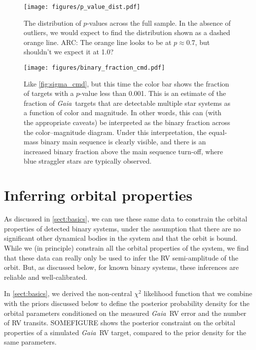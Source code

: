 \documentclass[modern, letterpaper]{aastex631}
\newcommand{\project}[1]{\textsl{#1}}
\newcommand{\Gaia}{\project{Gaia}}
\begin{document}
\begin{figure}
	\begin{centering}
		\texttt{[image: figures/p\_value\_dist.pdf]}
		\caption{The distribution of $p$-values across the full sample. In the absence of outliers, we would expect to find the distribution shown as a dashed orange line. ARC: The orange line looks to be at $p \approx$0.7, but shouldn't we expect it at 1.0?}
		\label{fig:p_value_dist}
	\end{centering}
\end{figure}

\begin{figure}
	\begin{centering}
		\texttt{[image: figures/binary\_fraction\_cmd.pdf]}
		\caption{Like \autoref{fig:sigma_cmd}, but this time the color bar shows the fraction of targets with a $p$-value less than 0.001. This is an estimate of the fraction of \Gaia\ targets that are detectable multiple star systems as a function of color and magnitude. In other words, this can (with the appropriate caveats) be interpreted as the binary fraction across the color--magnitude diagram. Under this interpretation, the equal-mass binary main sequence is clearly visible, and there is an increased binary fraction above the main sequence turn-off, where blue straggler stars are typically observed.}
		\label{fig:binary_fraction_cmd}
	\end{centering}
\end{figure}


\section{Inferring orbital properties}

As discussed in \autoref{sect:basics}, we can use these same data to constrain the orbital properties of detected binary systems, under the assumption that there are no significant other dynamical bodies in the system and that the orbit is bound.
While we (in principle) constrain all the orbital properties of the system, we find that these data can really only be used to infer the RV semi-amplitude of the orbit.
But, as discussed below, for known binary systems, these inferences are reliable and well-calibrated.

In \autoref{sect:basics}, we derived the non-central $\chi^2$ likelihood function that we combine with the priors discussed below to define the posterior probability density for the orbital parameters conditioned on the measured \Gaia\ RV error and the number of RV transits.
SOMEFIGURE shows the posterior constraint on the orbital properties of a simulated \Gaia\ RV target, compared to the prior density for the same parameters.
\end{document}
